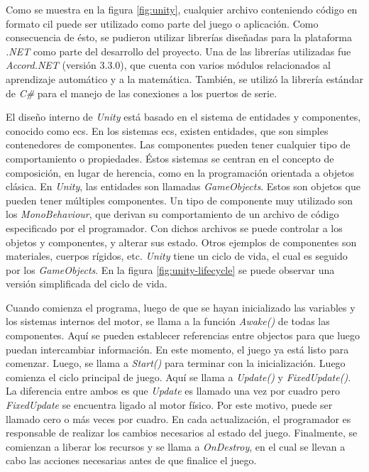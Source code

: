 Como se muestra en la figura \ref{fig:unity}, cualquier archivo conteniendo código en formato \acrshort{cil} puede ser utilizado como parte del juego o aplicación. Como consecuencia de ésto, se pudieron utilizar librerías diseñadas para la plataforma \emph{.NET} como parte del desarrollo del proyecto. Una de las librerías utilizadas fue \emph{Accord.NET} (versión $3\text{.}3\text{.}0$), que cuenta con varios módulos relacionados al aprendizaje automático y a la matemática\cite{accord-net}. También, se utilizó la librería estándar de \emph{C\#} para el manejo de las conexiones a los puertos de serie.

El diseño interno de \emph{Unity} está basado en el sistema de entidades y componentes, conocido como \gls{ecs}. En los sistemas \acrshort{ecs}, existen entidades, que son simples contenedores de componentes. Las componentes pueden tener cualquier tipo de comportamiento o propiedades. Éstos sistemas se centran en el concepto de composición, en lugar de herencia, como en la programación orientada a objetos clásica. En \emph{Unity}, las entidades son llamadas \emph{GameObjects}. Estos son objetos que pueden tener múltiples componentes. Un tipo de componente muy utilizado son los \emph{MonoBehaviour}, que derivan su comportamiento de un archivo de código especificado por el programador. Con dichos archivos se puede controlar a los objetos y componentes, y alterar sus estado. Otros ejemplos de componentes son materiales, cuerpos rígidos, etc. \emph{Unity} tiene un ciclo de vida, el cual es seguido por los \emph{GameObjects}. En la figura \ref{fig:unity-lifecycle} se puede observar una versión simplificada del ciclo de vida.

 Cuando comienza el programa, luego de que se hayan inicializado las variables y los sistemas internos del motor, se llama a la función \emph{Awake()} de todas las componentes. Aquí se pueden establecer referencias entre objectos para que luego puedan intercambiar información. En este momento, el juego ya está listo para comenzar. Luego, se llama a \emph{Start()} para terminar con la inicialización. Luego comienza el ciclo principal de juego. Aquí se llama a \emph{Update()} y \emph{FixedUpdate()}. La diferencia entre ambos es que \emph{Update} es llamado una vez por cuadro pero \emph{FixedUpdate} se encuentra ligado al motor físico. Por este motivo, puede ser llamado cero o más veces por cuadro. En cada actualización, el programador es responsable de realizar los cambios necesarios al estado del juego. Finalmente, se comienzan a liberar los recursos y se llama a \emph{OnDestroy}, en el cual se llevan a cabo las acciones necesarias antes de que finalice el juego.

